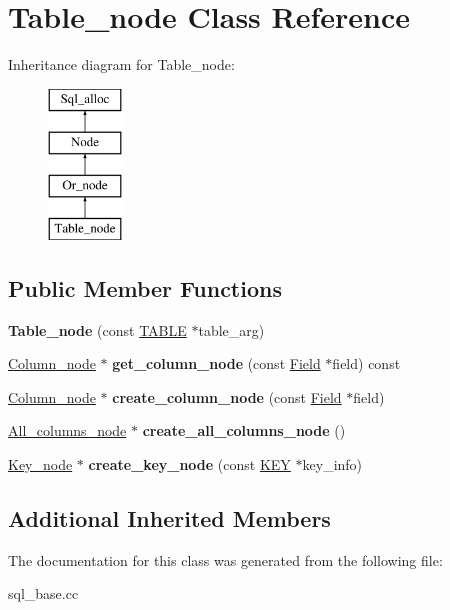 \hypertarget{classTable__node}{}\section{Table\+\_\+node Class Reference}
\label{classTable__node}
Inheritance diagram for Table\+\_\+node\+:\begin{figure}[H]
\begin{center}
\leavevmode
\includegraphics[height=4.000000cm]{classTable__node}
\end{center}
\end{figure}
\subsection*{Public Member Functions}
\begin{DoxyCompactItemize}
\item 
{\bfseries Table\+\_\+node} (const \mbox{\hyperlink{structTABLE}{T\+A\+B\+LE}} $\ast$table\+\_\+arg)
\item 
\mbox{\hyperlink{classOr__node}{Column\+\_\+node}} $\ast$ {\bfseries get\+\_\+column\+\_\+node} (const \mbox{\hyperlink{classField}{Field}} $\ast$field) const
\item 
\mbox{\hyperlink{classOr__node}{Column\+\_\+node}} $\ast$ {\bfseries create\+\_\+column\+\_\+node} (const \mbox{\hyperlink{classField}{Field}} $\ast$field)
\item 
\mbox{\hyperlink{classAnd__node}{All\+\_\+columns\+\_\+node}} $\ast$ {\bfseries create\+\_\+all\+\_\+columns\+\_\+node} ()
\item 
\mbox{\hyperlink{classAnd__node}{Key\+\_\+node}} $\ast$ {\bfseries create\+\_\+key\+\_\+node} (const \mbox{\hyperlink{structst__key}{K\+EY}} $\ast$key\+\_\+info)
\end{DoxyCompactItemize}
\subsection*{Additional Inherited Members}


The documentation for this class was generated from the following file\+:\begin{DoxyCompactItemize}
\item 
sql\+\_\+base.\+cc\end{DoxyCompactItemize}
